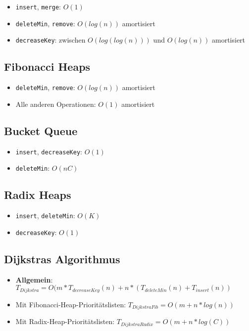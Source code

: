 \documentclass[10pt,a4paper]{article}
\begin{document}
	\begin{itemize}
		\item \texttt{insert}, \texttt{merge}: $O(1)$
		\item \texttt{deleteMin}, \texttt{remove}: $O(log (n))$ amortisiert
		\item \texttt{decreaseKey}: zwischen $O(log (log (n)))$ und $O(log (n))$ amortisiert
	\end{itemize}
	
	\subsection{Fibonacci Heaps}
	\label{lz:sub:fibonacci_heaps}
	
	\begin{itemize}
		\item \texttt{deleteMin}, \texttt{remove}: $O(log (n))$ amortisiert
		\item Alle anderen Operationen: $O(1)$ amortisiert
	\end{itemize}

	\subsection{Bucket Queue}
	\label{lz:sub:bucket_queue}
	
	\begin{itemize}
		\item \texttt{insert}, \texttt{decreaseKey}: $O(1)$
		\item \texttt{deleteMin}: $O(nC)$
	\end{itemize}

	\subsection{Radix Heaps}
	\label{lz:sub:radix_heaps}
	
	\begin{itemize}
		\item \texttt{insert}, \texttt{deleteMin}: $O(K)$
		\item \texttt{decreaseKey}: $O(1)$
	\end{itemize}

	\subsection{Dijkstras Algorithmus}
	\label{lz:sub:dijkstras_algorithmus}
	
	\begin{itemize}
		\item \textbf{Allgemein}: $T_{Dijkstra} = O(m * T_{decreaseKey}(n) + n * (T_{deleteMin}(n) + T_{insert}(n))$
		\item Mit Fibonacci-Heap-Prioritätslisten: $T_{DijkstraFib} = O(m + n * log (n))$
		\item Mit Radix-Heap-Prioritätslisten: $T_{DijkstraRadix} = O(m + n * log (C))$
	\end{itemize}
\end{document}
